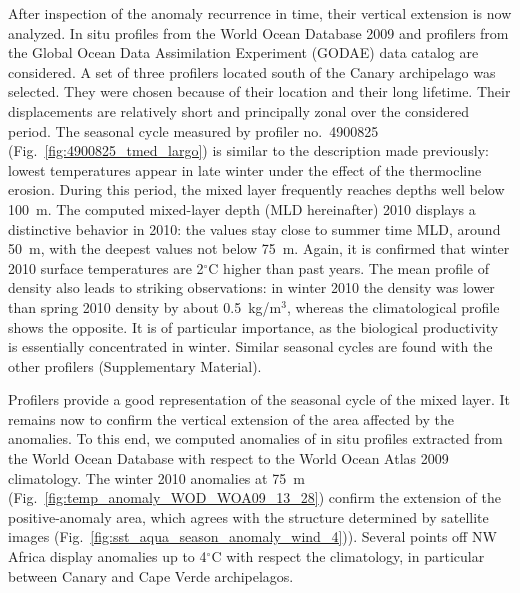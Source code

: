 \documentclass[12pt]{article}
\begin{document}
After inspection of the anomaly recurrence in time, their vertical extension is now analyzed. In situ profiles from the World Ocean Database 2009 \citep[WOD09,][]{BOYER09} and profilers from the Global Ocean Data Assimilation Experiment (GODAE) data catalog are considered. A set of three profilers located south of the Canary archipelago was selected. They were chosen because of their location and their long lifetime. Their displacements are relatively short and principally zonal over the considered period. The seasonal cycle measured by profiler no.~4900825 (Fig.~\ref{fig:4900825_tmed_largo}) is similar to the description made previously: lowest temperatures appear in late winter under the effect of the thermocline erosion. During this period, the mixed layer frequently reaches depths well below 100~m. The computed mixed-layer depth (MLD hereinafter) 2010 displays a distinctive behavior in 2010: the values stay close to summer time MLD, around 50~m, with the deepest values not below 75~m. Again, it is confirmed that winter 2010 surface temperatures are 2$^{\circ}$C higher than past years. The mean profile of density also leads to striking observations: in winter 2010 the density was lower than spring 2010 density by about 0.5~kg/m$^{3}$, whereas the climatological profile shows the opposite. It is of particular importance, as the biological productivity is essentially concentrated in winter. Similar seasonal cycles are found with the other profilers (Supplementary Material). 

Profilers provide a good representation of the seasonal cycle of the mixed layer. It remains now to confirm the vertical extension of the area affected by the anomalies. To this end, we computed anomalies of in situ profiles extracted from the World Ocean Database with respect to the World Ocean Atlas 2009 climatology. The winter 2010 anomalies at 75~m (Fig.~\ref{fig:temp_anomaly_WOD_WOA09_13_28}) confirm the extension of the positive-anomaly area, which agrees with the structure determined by satellite images (Fig.~\ref{fig:sst_aqua_season_anomaly_wind_4})). Several points off NW Africa display anomalies up to 4$^{\circ}$C with respect the climatology, in particular between Canary and Cape Verde archipelagos.
\end{document}

